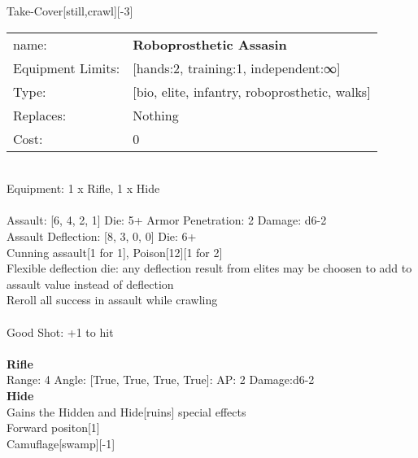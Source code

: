 \noindent Take-Cover[still,crawl][-3]\\ 


\noindent
\begin{tabular}{ll}
name: &{\bf Roboprosthetic Assasin } \\
Equipment Limits: &[hands:2, training:1, independent:∞] \\
Type: &[bio, elite, infantry, roboprosthetic, walks] \\
Replaces: &Nothing \\
Cost: & 0\\
\end{tabular}
\ \\
Equipment: 1 x Rifle, 1 x Hide \\
\ \\
Assault: [6, 4, 2, 1] Die: 5+ Armor Penetration: 2 Damage: d6-2 \\
Assault Deflection: [8, 3, 0, 0] Die: 6+\\
\indent Cunning assault[1 for 1], Poison[12][1 for 2]\\ 
Flexible deflection die: any deflection result from elites may be choosen to add to assault value instead of deflection\\ 
Reroll all success in assault while crawling\\ 
 
\ \\
Good Shot: +1 to hit\\ 

\ \\
{\bf Rifle } \\



Range: 4  Angle: [True, True, True, True]: AP: 2 Damage:d6-2 \\




{\bf Hide } \\

Gains the Hidden and Hide[ruins] special effects\\ 
Forward positon[1]\\ 
Camuflage[swamp][-1]\\ 





 
\ \\



